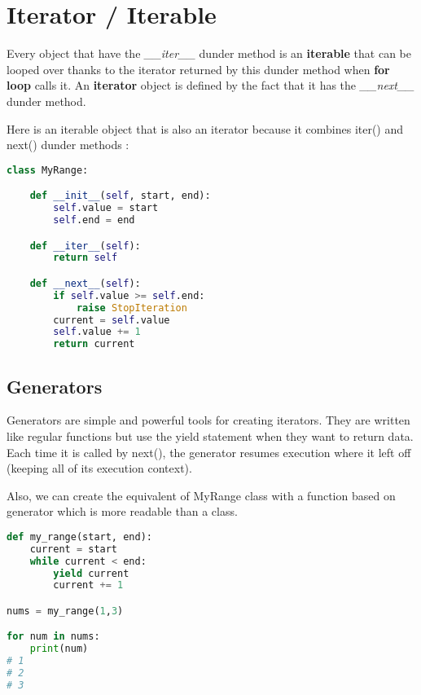 \documentclass[a4paper, 12pt, titlepage]{scrartcl} %
\begin{document}
\newpage
\section{Iterator / Iterable}
Every object that have the \textit{\_\_iter\_\_} dunder method is an \textbf{iterable} that can be looped over thanks to the iterator returned by this dunder method when \textbf{for loop} calls it. An \textbf{iterator} object is defined by the fact that it has the \textit{\_\_next\_\_} dunder method. 

\vspace{5mm}

Here is an iterable object that is also an iterator because it combines iter() and next() dunder methods :
\begin{lstlisting}[language=Python]
class MyRange:

    def __init__(self, start, end):
        self.value = start
        self.end = end

    def __iter__(self):
        return self

    def __next__(self):
        if self.value >= self.end:
            raise StopIteration
        current = self.value
        self.value += 1
        return current
\end{lstlisting} \vspace{5mm}

\subsection{Generators}
\label{subsec:Generators}
Generators are simple and powerful tools for creating iterators. They are written like regular functions but use the yield statement when they want to return data. Each time it is called by next(), the generator resumes execution where it left off (keeping all of its execution context). 

\vspace{5mm}

Also, we can create the equivalent of MyRange class with a function based on generator which is more readable than a class.
\begin{lstlisting}[language=Python]
def my_range(start, end):
    current = start
    while current < end:
        yield current
        current += 1

nums = my_range(1,3)

for num in nums:
    print(num)
# 1
# 2
# 3
\end{lstlisting} \vspace{5mm}
\end{document}
